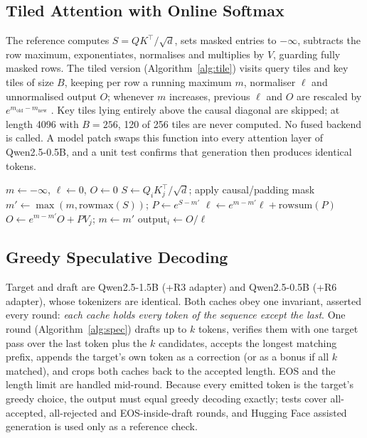 \documentclass[conference]{IEEEtran}
\begin{document}
\subsection{Tiled Attention with Online Softmax}
The reference computes $S=QK^\top/\sqrt{d}$, sets masked entries to $-\infty$, subtracts the row maximum, exponentiates, normalises and multiplies by $V$, guarding fully masked rows. The tiled version (Algorithm~\ref{alg:tile}) visits query tiles and key tiles of size $B$, keeping per row a running maximum $m$, normaliser $\ell$ and unnormalised output $O$; whenever $m$ increases, previous $\ell$ and $O$ are rescaled by $e^{m_{\text{old}}-m_{\text{new}}}$ \cite{milakov2018online,dao2022flashattention}. Key tiles lying entirely above the causal diagonal are skipped; at length 4096 with $B=256$, 120 of 256 tiles are never computed. No fused backend is called. A model patch swaps this function into every attention layer of Qwen2.5-0.5B, and a unit test confirms that generation then produces identical tokens.

\begin{algorithm}[t]
\caption{Tiled online-softmax attention (per head)}\label{alg:tile}
\begin{algorithmic}[1]
  \State $m\gets-\infty$, $\ell\gets 0$, $O\gets 0$
    \State $S\gets Q_iK_j^\top/\sqrt d$; apply causal/padding mask
    \State $m'\gets\max(m,\mathrm{rowmax}(S))$; $P\gets e^{S-m'}$
    \State $\ell\gets e^{m-m'}\ell+\mathrm{rowsum}(P)$
    \State $O\gets e^{m-m'}O+PV_j$; $m\gets m'$
  \EndFor
  \State output$_i\gets O/\ell$ 
\EndFor
\end{algorithmic}
\end{algorithm}

\subsection{Greedy Speculative Decoding}
Target and draft are Qwen2.5-1.5B (+R3 adapter) and Qwen2.5-0.5B (+R6 adapter), whose tokenizers are identical. Both caches obey one invariant, asserted every round: \emph{each cache holds every token of the sequence except the last}. One round (Algorithm~\ref{alg:spec}) drafts up to $k$ tokens, verifies them with one target pass over the last token plus the $k$ candidates, accepts the longest matching prefix, appends the target's own token as a correction (or as a bonus if all $k$ matched), and crops both caches back to the accepted length. EOS and the length limit are handled mid-round. Because every emitted token is the target's greedy choice, the output must equal greedy decoding exactly; tests cover all-accepted, all-rejected and EOS-inside-draft rounds, and Hugging Face assisted generation is used only as a reference check.
\end{document}
